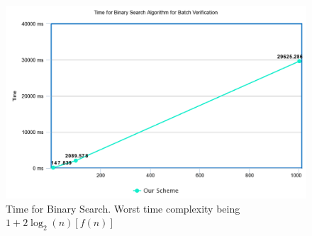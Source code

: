 \documentclass[10pt,journal,letterpaper]{IEEEtran}
\begin{document}
\begin{figure}[h]
    \centering
    \captionsetup{justification=centering}
    \includegraphics[scale=0.2]{bin.png}
    \caption{Time for Binary Search. Worst time complexity being $1 + 2 \log_2(n)[f(n)]$ }
    \label{fig:Binary_Search_Time}
\end{figure}
\end{document}
